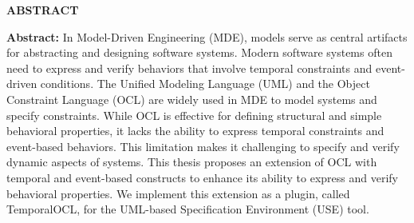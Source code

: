 \begin{center}
  \textbf{\large{ABSTRACT}	}
\end{center}


\begin{small}

\textbf{Abstract:} In Model-Driven Engineering (MDE), models serve as central artifacts 
for abstracting and designing software systems. Modern software systems often need 
to express and verify behaviors that involve temporal constraints and event-driven 
conditions. The Unified Modeling Language (UML) and the Object Constraint Language
(OCL) are widely used in MDE to model systems and specify constraints. While OCL is
effective for defining structural and simple behavioral properties, it lacks the
ability to express temporal constraints and event-based behaviors. This limitation
makes it challenging to specify and verify dynamic aspects of systems. This thesis
proposes an extension of OCL with temporal and event-based constructs to enhance
its ability to express and verify behavioral properties. We implement this extension
as a plugin, called TemporalOCL, for the UML-based Specification Environment (USE) tool.


\end{small}
